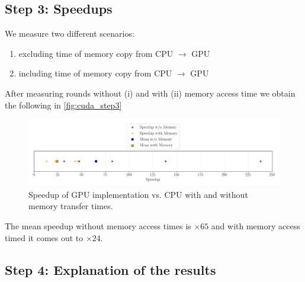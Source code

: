 \subsection{Step 3: Speedups}
We measure two different scenarios: 
\begin{enumerate}[i]
    \item excluding time of memory copy from CPU $\rightarrow$ GPU
    \item including time of memory copy from CPU $\rightarrow$ GPU
\end{enumerate}
After measuring  rounds without (i) and with (ii) memory access time we obtain the following  in \autoref{fig:cuda_step3}
\begin{figure}[H]
    \centering
    \includegraphics[width=\textwidth]{../fig/lab3/step3.png}
    \caption{Speedup of GPU implementation vs. CPU with and without memory transfer times.}
    \label{fig:cuda_step3}
\end{figure}
The mean speedup without memory access times is $\times 65$ and with memory access timed it comes out to $\times 24$.
\subsection{Step 4: Explanation of the results}

